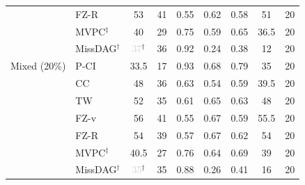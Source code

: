 \begin{tabular}{llccccccc}
                     & FZ-R               & 53 & 41 & 0.55 & 0.62 & 0.58 & 51 & 20 \\
                     & MVPC$^\ddagger$    & 40 & 29 & 0.75 & 0.59 & 0.65 & 36.5 & 20 \\
                     & MissDAG$^\dagger$  & \textcolor{lightgray}{37}$^\dagger$ & 36 & 0.92 & 0.24 & 0.38 & 12 & 20 \\
    \midrule
    Mixed (20\%)     & P-CI               & 33.5 & 17 & 0.93 & 0.68 & 0.79 & 35 & 20 \\
                     & CC                 & 48 & 36 & 0.63 & 0.54 & 0.59 & 39.5 & 20 \\
                     & TW                 & 52 & 35 & 0.61 & 0.65 & 0.63 & 48 & 20 \\
                     & FZ-v               & 56 & 41 & 0.55 & 0.67 & 0.59 & 55.5 & 20 \\
                     & FZ-R               & 54 & 39 & 0.57 & 0.67 & 0.62 & 54 & 20 \\
                     & MVPC$^\ddagger$    & 40.5 & 27 & 0.76 & 0.64 & 0.69 & 39 & 20 \\
                     & MissDAG$^\dagger$  & \textcolor{lightgray}{35}$^\dagger$ & 35 & 0.88 & 0.26 & 0.41 & 16 & 20 \\
    \bottomrule
\end{tabular}
